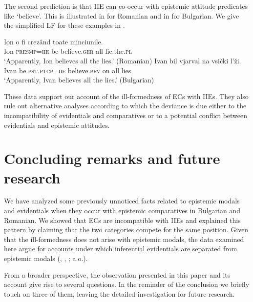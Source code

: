 \documentclass[output=paper,
]{langscibook}
\begin{document}
\noindent The second prediction is that IIE can co-occur with epistemic attitude predicates like `believe'. This is illustrated in  for Romanian and in  for Bulgarian. We give the simplified LF for these examples in . 

    \ea \ea \gll Ion o fi crezând toate minciunile.\\
    Ion \textsc{presmp=iie} be believe.\textsc{ger} all lie.the.\textsc{pl} \\
    \glt `Apparently, Ion believes all the lies.'  \hfill (Romanian) \label{bela}
	\ex \gll Ivan bil vjarval na vsički l'ži.\\
   	 Ivan be.\textsc{pst.ptcp=iie} believe.\textsc{pfv} on all lies \\
    \glt `Apparently, Ivan believes all the lies.'   \hfill (Bulgarian) \label{belb}
     \label{belc}
    \z \z 

\noindent These data support our account of the ill-formedness of ECs with IIEs. They also rule out alternative analyses according to which the deviance is due either to the incompatibility of evidentials and comparatives or to a potential conflict between evidentials and epistemic attitudes. 

\section{Concluding remarks and future research}\label{ConcludRem}

We have analyzed some previously unnoticed facts related to epistemic modals and evidentials when they occur with epistemic comparatives in Bulgarian and Romanian. We showed that ECs are incompatible with IIEs and explained this pattern by claiming that the two categories compete for the same position. Given that the ill-formedness does not arise with epistemic modals, the  data examined here argue for accounts under which inferential evidentials are separated from epistemic modals (\citealt{fall02}, \citealt{aikh14}, \citealt{murray10}; a.o.). 

From a broader perspective, the observation presented in this paper and its account give rise to several  questions. In the reminder of the conclusion we briefly touch on three of them, leaving the detailed investigation for future research. 
\end{document}
